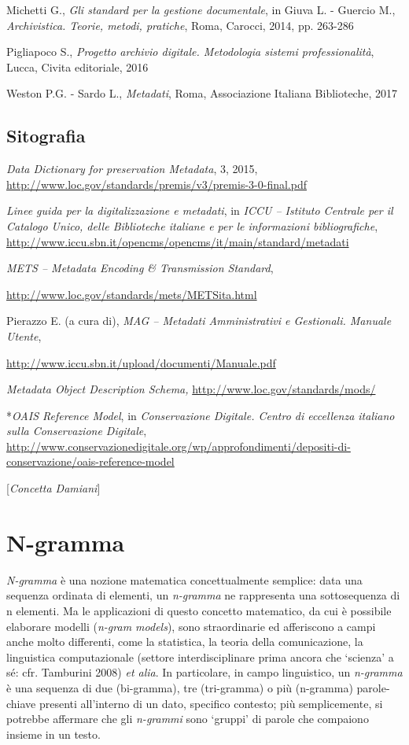 {{{Michetti G., \emph{Gli standard per la gestione documentale}, in Giuva
L. - Guercio M., \emph{Archivistica. Teorie, metodi, pratiche}, Roma,
Carocci, 2014, pp. 263-286

Pigliapoco S., \emph{Progetto archivio digitale. Metodologia sistemi
professionalità}, Lucca, Civita editoriale, 2016

Weston P.G. - Sardo L., \emph{Metadati}, Roma, Associazione Italiana
Biblioteche, 2017
}

\section*{Sitografia}
{\parindent0pt 
\emph{Data Dictionary for preservation Metadata}, 3, 2015,
\url{http://www.loc.gov/standards/premis/v3/premis-3-0-final.pdf}

\emph{Linee guida per la digitalizzazione e metadati}, in \emph{ICCU --
Istituto Centrale per il Catalogo Unico, delle Biblioteche italiane e
per le informazioni bibliografiche},
\url{http://www.iccu.sbn.it/opencms/opencms/it/main/standard/metadati}
}

\emph{METS -- Metadata Encoding \& Transmission Standard},

\url{http://www.loc.gov/standards/mets/METSita.html}

Pierazzo E. (a cura di), \emph{MAG -- Metadati Amministrativi e
Gestionali. Manuale Utente},

\url{http://www.iccu.sbn.it/upload/documenti/Manuale.pdf}

\emph{Metadata Object Description Schema,}
\url{http://www.loc.gov/standards/mods/}

*\emph{OAIS Reference Model}, in \emph{Conservazione Digitale. Centro di
eccellenza italiano sulla Conservazione Digitale},
\url{http://www.conservazionedigitale.org/wp/approfondimenti/depositi-di-conservazione/oais-reference-model}
}

\hrulefill 

{[}\emph{Concetta Damiani}{]}





\chapter{N-gramma}

\emph{N-gramma} è una nozione matematica concettualmente semplice: data
una sequenza ordinata di elementi, un \emph{n-gramma} ne rappresenta una
sottosequenza di n elementi. Ma le applicazioni di questo concetto
matematico, da cui è possibile elaborare modelli (\emph{n-gram models}),
sono straordinarie ed afferiscono a campi anche molto differenti, come
la statistica, la teoria della comunicazione, la linguistica
computazionale (settore interdisciplinare prima ancora che `scienza' a
sé: cfr. Tamburini 2008) \emph{et alia}. In particolare, in campo
linguistico, un \emph{n-gramma} è una sequenza di due (bi-gramma), tre
(tri-gramma) o più (n-gramma) parole-chiave presenti all'interno di un
dato, specifico contesto; più semplicemente, si potrebbe affermare che
gli \emph{n-grammi} sono `gruppi' di parole che compaiono insieme in un
testo.

}
